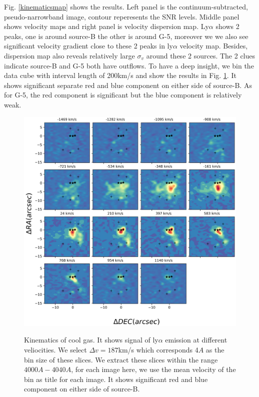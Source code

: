\documentclass[../Results.tex]{subfiles}
\begin{document}
	Fig. \ref{kinematicsmap} shows the results. Left panel is the continuum-subtracted, pseudo-narrowband image, contour reperesents the SNR levels. Middle panel shows velocity maps and right panel is velocity dispersion map. Ly$\alpha$ shows 2 peaks, one is around source-B the other is around G-5, moreover we we also see significant velocity gradient close to these 2 peaks in ly$\alpha$ velocity map. Besides, dispersion map also reveals relatively large $\sigma_{v}$ around these 2 sources. The 2 clues indicate source-B and G-5 both have outflows. To have a deep insight, we bin the data cube with interval length of 200km/s and show the results in Fig. \ref{slices}. It shows significant separate red and blue component on either side of source-B. As for G-5, the red component is significant but the blue component is relatively weak. 
	\begin{figure}[htp]
		\centering
		\includegraphics[width=\textwidth]{figs/slices}
		\label{slices}
		\caption{Kinematics of cool gas. It shows signal of ly$\alpha$ emission at different veliocities. We select $\Delta v=187$km/s which corresponds 4$A$  as the bin size of these slices. We extract these slices within the range $4000A-4040A$, for each image here, we use the mean velocity of the bin as title for each image. It shows significant red and blue component on either side of source-B.}
	\end{figure}
	
\end{document}
